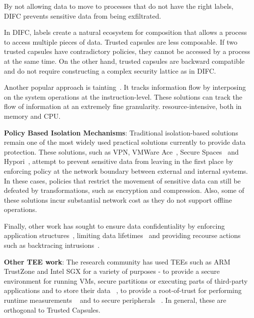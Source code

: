By not allowing data to move to processes that do not have the right labels,
DIFC prevents sensitive data from being exfiltrated. 
 
In DIFC, labels create a natural ecosystem for composition that allows a process
to access multiple pieces of data. Trusted capsules are less composable. If two
trusted capsules have contradictory policies, they cannot be accessed by a
process at the same time. On the other hand, trusted capsules are backward
compatible and do not require constructing a complex security lattice as in
DIFC.

Another popular approach is tainting~\cite{demandemulation, neon, taintdroid,
practicaltainting}. It tracks information flow by interposing on the system
operations at the instruction-level. 
These solutions can track the flow of information at an extremely fine granularity.
resource-intensive, both in memory and CPU. 

\textbf{Policy Based Isolation Mechanisms}: Traditional isolation-based
solutions remain one of the most widely used practical solutions currently to
provide data protection. These solutions, such as VPN, VMWare
Ace~\cite{VMWareAce}, Secure Spaces~\cite{securespaces} and
Hypori~\cite{hypori}, attempt to prevent sensitive data from leaving in the
first place by enforcing policy at the network boundary between external and
internal systems. In these cases, policies that restrict the movement of sensitive
data can still be defeated by transformations, such as encryption and
compression. Also, some of these solutions incur substantial network cost
as they do not support offline operations. 

Finally, other work has sought to ensure data confidentiality by enforcing
application structures~\cite{Cleanroom, privacycapsules}, limiting data
lifetimes~\cite{enforcinglifetime, lacuna} and providing recourse actions such
as backtracing intrusions~\cite{Backtracking, taser}.


\textbf{Other TEE work}: The research community has used TEEs such as ARM
TrustZone and Intel SGX for a variety of purposes - to provide a secure
environment for running VMs, secure partitions or executing parts of third-party
applications and to store their data   ~\cite{TLR, Nokia1, Nokia2}, to provide a
root-of-trust for performing runtime measurements ~\cite{restrictedspaces,
hypervision,SKEE,secvisor} and to secure peripherals ~\cite{TrustedSensors}. In
general, these are orthogonal to Trusted Capsules. 


